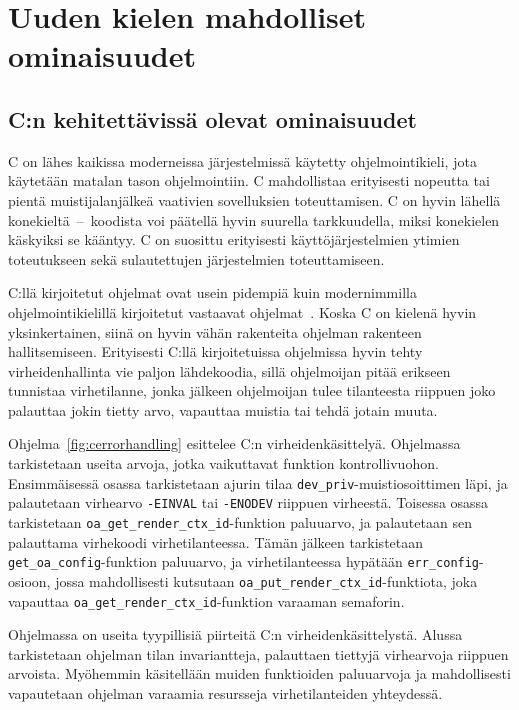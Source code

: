 \section{Uuden kielen mahdolliset ominaisuudet}

\subsection{C:n kehitettävissä olevat ominaisuudet}

C on lähes kaikissa moderneissa järjestelmissä käytetty ohjelmointikieli, jota
käytetään matalan tason ohjelmointiin. C mahdollistaa erityisesti nopeutta tai
pientä muistijalanjälkeä vaativien sovelluksien toteuttamisen. C on hyvin
lähellä konekieltä~--~koodista voi päätellä hyvin suurella tarkkuudella, miksi
konekielen käskyiksi se kääntyy. C on suosittu erityisesti käyttöjärjestelmien
ytimien toteutukseen sekä sulautettujen järjestelmien toteuttamiseen.

C:llä kirjoitetut ohjelmat ovat usein pidempiä kuin modernimmilla
ohjelmointikielillä kirjoitetut vastaavat ohjelmat~\citep{codelength,
qsmcodelength}. Koska C on kielenä hyvin yksinkertainen, siinä on hyvin vähän
rakenteita ohjelman rakenteen hallitsemiseen. Erityisesti C:llä kirjoitetuissa
ohjelmissa hyvin tehty virheidenhallinta vie paljon lähdekoodia, sillä
ohjelmoijan pitää erikseen tunnistaa virhetilanne, jonka jälkeen ohjelmoijan
tulee tilanteesta riippuen joko palauttaa jokin tietty arvo, vapauttaa muistia
tai tehdä jotain muuta.

Ohjelma~\ref{fig:cerrorhandling} esittelee C:n virheidenkäsittelyä. Ohjelmassa
tarkistetaan useita arvoja, jotka vaikuttavat funktion kontrollivuohon.
Ensimmäisessä osassa tarkistetaan ajurin tilaa
\texttt{dev\_priv}-muistiosoittimen läpi, ja palautetaan virhearvo
\texttt{-EINVAL} tai \texttt{-ENODEV} riippuen virheestä. Toisessa osassa
tarkistetaan \texttt{oa\_get\_render\_ctx\_id}-funktion paluuarvo, ja
palautetaan sen palauttama virhekoodi virhetilanteessa. Tämän jälkeen
tarkistetaan \texttt{get\_oa\_config}-funktion paluuarvo, ja virhetilanteessa
hypätään \texttt{err\_config}-osioon, jossa mahdollisesti kutsutaan
\texttt{oa\_put\_render\_ctx\_id}-funktiota, joka vapauttaa
\texttt{oa\_get\_render\_ctx\_id}-funktion varaaman semaforin.

Ohjelmassa on useita tyypillisiä piirteitä C:n virheidenkäsittelystä. Alussa
tarkistetaan ohjelman tilan invariantteja, palauttaen tiettyjä virhearvoja
riippuen arvoista. Myöhemmin käsitellään muiden funktioiden paluuarvoja ja
mahdollisesti vapautetaan ohjelman varaamia resursseja virhetilanteiden
yhteydessä.

